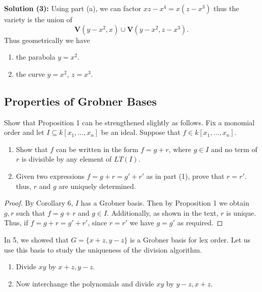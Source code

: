 \textbf{Solution (3):}
Using part (a), we can factor $xz - x^4 = x(z - x^3)$ thus the variety 
is the union of 
\[\mathbf{V}(y - x^2, x) \cup \mathbf{V}(y - x^2, z - x^3).\] 
Thus geometrically we have
\begin{enumerate}
    \item the parabola $y = x^2$.
    \item the curve $y = x^2$, $z = x^3$.
\end{enumerate}

\subsection{Properties of Grobner Bases}

\begin{tcolorbox}[title=Problem 1, breakable]
    Show that Proposition 1 can be strengthened slightly as follows.
    Fix a monomial order and let $I \subseteq k[x_1, \ldots, x_n]$ be an ideal.
    Suppose that $f \in k[x_1, \ldots, x_n]$.
    \begin{enumerate}
        \item Show that $f$ can be written in the form $f = g + r$, where $g \in I$ and no 
        term of $r$ is divisible by any element of $LT(I)$.
        \item Given two expressions $f = g + r = g' + r'$ as in part (1), prove that $r = r'$.
        thus, $r$ and $g$ are uniquely determined.
    \end{enumerate}
\end{tcolorbox}

\begin{proof}
    By Corollary 6, $I$ has a Grobner basis.
    Then by Proposition 1 we obtain $g, r$ such that $f = g + r$ and $g \in I$.
    Additionally, as shown in the text, $r$ is unique.
    Thus, if $f = g + r = g' + r'$, since $r = r'$ we have $g = g'$ as required.
\end{proof}

\begin{tcolorbox}[title=Problem 2, breakable]
    In 5, we showed that $G = \{x + z, y - z\}$ is a Grobner basis for lex order.
    Let us use this basis to study the uniqueness of the division algorithm.
    \begin{enumerate}
        \item Divide $xy$ by $x + z, y - z$.
        \item Now interchange the polynomials and divide $xy$ by $y - z, x + z$.
    \end{enumerate}
\end{tcolorbox}

